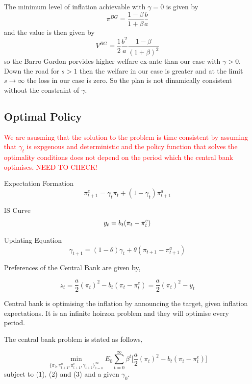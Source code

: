 \documentclass[12pt]{article}
\theoremstyle{definition}
\theoremstyle{plain}
\theoremstyle{plain}
\theoremstyle{remark}
\theoremstyle{plain}
\begin{document}
\justify
The minimum level of inflation achievable with $\gamma=0$ is given
by 
\[
\pi^{BG}=\frac{1-\beta}{1+\beta}\frac{b}{a}
\]
and the value is then given by 
\[
V^{BG}=\frac{1}{2}\frac{b^{2}}{a}\frac{1-\beta}{\left(1+\beta\right)^{2}}
\]
\justify
so the Barro Gordon porvides higher welfare ex-ante than our case
with $\gamma>0$. Down the road for $s>1$ then the welfare in our
case is greater and at the limit $s\rightarrow\infty$ the loss in
our case is zero.
\justify
So the plan is not dinamically consistent without the constraint of
$\gamma$. 

\newpage
\subsection{Optimal Policy}

\textcolor{red}{We are asusming that the solution to the problem is time consistent by assuming that $\gamma_{t}$ is expgenous and deterministic and the policy function that solves the optimality conditions does not depend on the period which the central bank optimises. NEED TO CHECK!} 

\justify
Expectation Formation
\begin{equation}
\pi^{e}_{t+1} = \gamma_{t}\pi_{t} + (1-\gamma_{t})\pi^{a}_{t+1} 
\end{equation}

\justify
IS Curve
\begin{equation}
y_{t} =b_{t}(\pi_{t}-\pi^{e}_{t}) \\
\end{equation}

\justify
Updating Equation
\begin{equation}
\gamma_{t+1} =(1-\theta)\gamma_{t} + \theta(\pi_{t+1} - \pi^{a}_{t+1}) 
\end{equation}

\justify 
Preferences of the Central Bank are given by, 

\begin{equation}
z_{t} = \frac{a}{2} (\pi_{t})^{2} - b_{t}(\pi_{t}-\pi^{e}_{t}) = \frac{a}{2} (\pi_{t})^{2} - y_{t} 
\end{equation}

\justify 
Central bank is optimising the inflation by announcing the target, given inflation expectations. It is an infinite hoirzon problem and they will optimise every period. 

\justify 
The central bank problem is stated as follows, 

\begin{equation}
\min_{\{\pi_{t}, \pi^{a}_{t+1}, \pi^{e}_{t+1}, \gamma_{t+1}\}^{\infty}_{t=0}} E_{0} \sum^{\infty}_{t=0} \beta^{t}\Big[\frac{a}{2} (\pi_{t})^{2} - b_{t}(\pi_{t}-\pi^{e}_{t})\Big]
\end{equation}
\justify
subject to (1), (2) and (3) and a given $\gamma_{0}$. 
\end{document}
